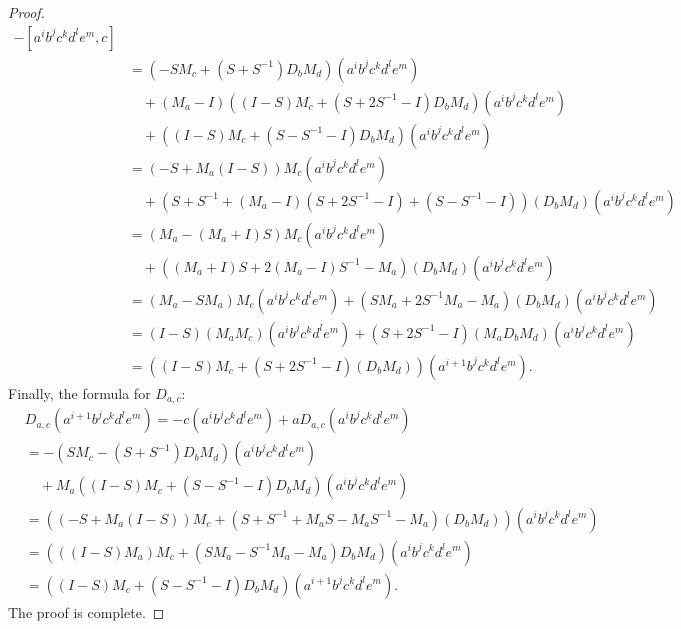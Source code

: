 \documentclass{amsart}
\theoremstyle{plain}
\theoremstyle{definition}
\begin{document}
\begin{proof}
\begin{align*}
  -
  [ a^i b^j c^k d^l e^m, c ]
  \\
  &=
  ( -S M_c + ( S + S^{-1} ) D_b M_d )
  ( a^i b^j c^k d^l e^m )
  \\
  &\quad
  +
  ( M_a - I )
  ( ( I - S ) M_c + ( S + 2 S^{-1} - I ) D_b M_d )
  ( a^i b^j c^k d^l e^m )
  \\
  &\quad
  +
  ( ( I - S ) M_c + ( S - S^{-1} - I ) D_b M_d )
  ( a^i b^j c^k d^l e^m )
  \\
  &=
  ( - S + M_a ( I - S ) ) M_c
  (a^i b^j c^k d^l e^m)
  \\
  &\quad
  +
  ( S + S^{-1} + ( M_a - I ) ( S {+} 2 S^{-1} {-} I ) + ( S {-} S^{-1} {-} I ) )
  ( D_b M_d )
  (a^i b^j c^k d^l e^m)
  \\
  &=
  ( M_a - ( M_a + I ) S ) M_c
  ( a^i b^j c^k d^l e^m )
  \\
  &\quad
  +
  ( ( M_a + I ) S + 2 ( M_a - I ) S^{-1} - M_a )
  ( D_b M_d )
  ( a^i b^j c^k d^l e^m )
  \\
  &=
  ( M_a - S M_a ) M_c
  ( a^i b^j c^k d^l e^m )
  +
  ( S M_a + 2 S^{-1} M_a - M_a )
  ( D_b M_d )
  ( a^i b^j c^k d^l e^m )
  \\
  &=
  ( I - S ) ( M_a M_c )
  ( a^i b^j c^k d^l e^m )
  +
  ( S + 2 S^{-1} - I )
  ( M_a D_b M_d )
  ( a^i b^j c^k d^l e^m )
  \\
  &=
  (
  ( I - S ) M_c + ( S + 2 S^{-1} - I ) ( D_b M_d )
  )
  (a^{i+1} b^j c^k d^l e^m).
  \end{align*}
Finally, the formula for $D_{a,c}$:
  \allowdisplaybreaks
  \begin{align*}
  &
  D_{a,c} (a^{i+1} b^j c^k d^l e^m)
  =
  - c ( a^i b^j c^k d^l e^m )
  +
  a D_{a,c} ( a^i b^j c^k d^l e^m )
  \\
  &=
  -
  ( S M_c - ( S + S^{-1} ) D_b M_d )
  ( a^i b^j c^k d^l e^m )
  \\
  &\quad
  +
  M_a
  ( ( I - S ) M_c + ( S - S^{-1} - I ) D_b M_d )
  ( a^i b^j c^k d^l e^m )
  \\
  &=
  (
  ( - S {+} M_a ( I {-} S ) ) M_c
  +
  ( S {+} S^{-1} {+} M_a S {-} M_a S^{-1} {-} M_a )
  ( D_b M_d )
  )
  ( a^i b^j c^k d^l e^m )
  \\
  &=
  ( ( ( I - S ) M_a ) M_c + ( S M_a - S^{-1} M_a - M_a ) D_b M_d )
  ( a^i b^j c^k d^l e^m )
  \\
  &=
  \left(
  ( I - S ) M_c
  +
  (  S - S^{-1} - I  ) D_b M_d
  \right)
  ( a^{i+1} b^j c^k d^l e^m ).
  \end{align*}
The proof is complete.
\end{proof}
\end{document}
